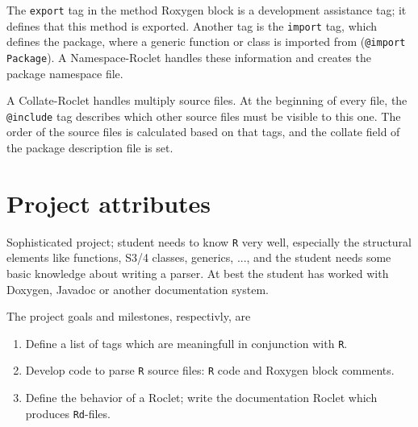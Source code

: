 \documentclass{mjaeartcl}
\begin{document}
The \texttt{export} tag in the method Roxygen block is a development
assistance tag; it defines that this method is exported. Another tag
is the \texttt{import} tag, which defines the package, where a
generic function or class is imported from (\texttt{@import
Package}). A Namespace-Roclet handles these information and creates
the package namespace file.

A Collate-Roclet handles multiply source files. At the beginning of
every file, the \texttt{@include} tag describes which other source
files must be visible to this one. The order of the source files is
calculated based on that tags, and the collate field of the package
description file is set.


\section*{Project attributes}

Sophisticated project; student needs to know \texttt{R} very well,
especially the structural elements like functions, S3/4 classes,
generics, ..., and the student needs some basic knowledge about
writing a parser. At best the student has worked with Doxygen, Javadoc
or another documentation system.

The project goals and milestones, respectivly, are
\begin{enumerate}
	\item Define a list of tags which are meaningfull in conjunction
	with \texttt{R}.

	\item Develop code to parse \texttt{R} source files: \texttt{R}
	code and Roxygen block comments.

	\item Define the behavior of a Roclet; write the documentation
	Roclet which produces \texttt{Rd}-files.
\end{enumerate}
\end{document}
